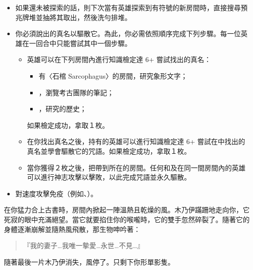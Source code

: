 \vspace*{-1em}
\begin{itemize}
  \item 如果還未被探索的話，則下次當有英雄探索到有\OmenSymbol{}符號的新房間時，直接搜尋預兆牌堆並抽將其取出，然後洗勻排堆。
  \item 你必須說出的真名以驅散它。為此，你必需依照順序完成下列步驟。每一位英雄在一回合中只能嘗試其中一個步驟。
        \begin{itemize}
          \item 英雄可以在下列房間內進行知識檢定達 6+ 嘗試找出的真名：
                \begin{itemize}
                  \item 有〈石棺 Sarcophagus〉的房間，研究象形文字；
                  \item {}，瀏覽考古團隊的筆記；
                  \item {}，研究的歷史；
                \end{itemize}
                如果檢定成功，拿取１枚。
          \item 在你找出真名之後，持有的英雄可以進行知識檢定達 6+ 嘗試在中找出的真名並學會驅散它的咒語。如果檢定成功，拿取１枚。
          \item 當你獲得２枚之後，把帶到所在的房間。任何和及在同一間房間內的英雄可以進行神志攻擊以擊敗，以此完成咒語並永久驅散。
        \end{itemize}
  \item {}對速度攻擊免疫（例如、）。
\end{itemize}

\begin{HauntStory}
  在你猛力合上古書時，房間內掀起一陣溫熱且乾燥的風。木乃伊蹣跚地走向你，它死寂的眼中充滿絕望。當它就要掐住你的喉嚨時，它的雙手忽然碎裂了。隨著它的身體逐漸崩解並隨熱風飛散，那生物呻吟著：
  \begin{quote}
    『我的妻子…我唯一摰愛…永世…不見…』
  \end{quote}
  隨著最後一片木乃伊消失，風停了。只剩下你形單影隻。
\end{HauntStory}
